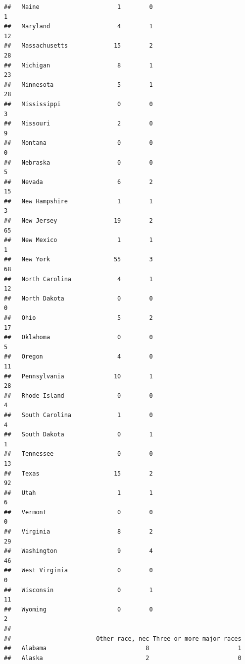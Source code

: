 \documentclass[]{book}
\theoremstyle{definition}
\theoremstyle{definition}
\theoremstyle{definition}
\theoremstyle{remark}
\begin{document}
\begin{verbatim}
##   Maine                      1        0                               1
##   Maryland                   4        1                              12
##   Massachusetts             15        2                              28
##   Michigan                   8        1                              23
##   Minnesota                  5        1                              28
##   Mississippi                0        0                               3
##   Missouri                   2        0                               9
##   Montana                    0        0                               0
##   Nebraska                   0        0                               5
##   Nevada                     6        2                              15
##   New Hampshire              1        1                               3
##   New Jersey                19        2                              65
##   New Mexico                 1        1                               1
##   New York                  55        3                              68
##   North Carolina             4        1                              12
##   North Dakota               0        0                               0
##   Ohio                       5        2                              17
##   Oklahoma                   0        0                               5
##   Oregon                     4        0                              11
##   Pennsylvania              10        1                              28
##   Rhode Island               0        0                               4
##   South Carolina             1        0                               4
##   South Dakota               0        1                               1
##   Tennessee                  0        0                              13
##   Texas                     15        2                              92
##   Utah                       1        1                               6
##   Vermont                    0        0                               0
##   Virginia                   8        2                              29
##   Washington                 9        4                              46
##   West Virginia              0        0                               0
##   Wisconsin                  0        1                              11
##   Wyoming                    0        0                               2
##                       
##                        Other race, nec Three or more major races
##   Alabama                            8                         1
##   Alaska                             2                         0

\end{verbatim}
\end{document}
